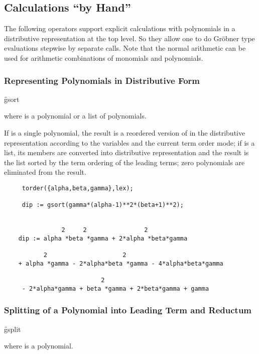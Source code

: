 \subsection{Calculations ``by Hand''}
The following operators support explicit calculations with
polynomials in a distributive representation at the \REDUCE top level.
So they allow one to do Gr\"obner type evaluations stepwise by
separate calls. Note that the normal \REDUCE arithmetic can be used
for arithmetic combinations of monomials and polynomials.

\subsubsection{Representing Polynomials in Distributive Form}
\hypertarget{operator:GSORT}{}
\begin{syntax}
  \f{gsort }
\end{syntax}
where  is a polynomial or a list of polynomials.

If  is a single polynomial, the result is a reordered version of 
in the distributive representation according to the variables and the
current term order mode; if  is a list, its members are converted
into distributive representation and the result is the list sorted by
the term ordering of the leading terms; zero polynomials are
eliminated from the result.

\begin{verbatim}
     torder({alpha,beta,gamma},lex);

     dip := gsort(gamma*(alpha-1)**2*(beta+1)**2);


                2     2                2
    dip := alpha *beta *gamma + 2*alpha *beta*gamma

           2                     2
    + alpha *gamma - 2*alpha*beta *gamma - 4*alpha*beta*gamma

                           2
     - 2*alpha*gamma + beta *gamma + 2*beta*gamma + gamma
\end{verbatim}

\subsubsection{Splitting of a Polynomial into Leading Term and Reductum}
\hypertarget{operator:GSPLIT}{}
\begin{syntax}
  \f{gsplit }
\end{syntax}
where  is a polynomial.


